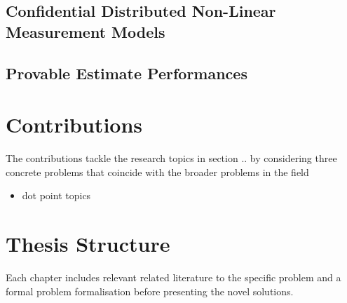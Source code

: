 \subsection{Confidential Distributed Non-Linear Measurement Models}\label{subsec:intro:conf_nonlin_measurements}

% 
% 

\subsection{Provable Estimate Performances}\label{subsec:intro:provable_est_perf}

% 
%                                                
%                                                
%                                                
% 

\section{Contributions}\label{sec:intro:contributions}

The contributions tackle the research topics in section .. by considering three concrete problems that coincide with the broader problems in the field

\begin{itemize}
    \item dot point topics
\end{itemize}



% 
%                                                                    
%                                                                    
%                                                                    
% 

\section{Thesis Structure}\label{sec:intro:structure}

Each chapter includes relevant related literature to the specific problem and a formal problem formalisation before presenting the novel solutions.